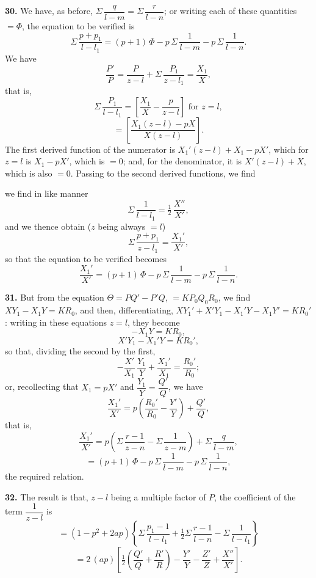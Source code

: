 \documentclass[11pt]{article}
\newcommand{\artno}[1]{\textbf{#1.}\quad}
\begin{document}
\artno{30} We have, as before, $\Sigma\,\dfrac{q}{l-m} = \Sigma\,\dfrac{r}{l-n}$; or writing each of these quantities $= \Phi$,
the equation to be verified is
\[
   \Sigma\,\frac{p+p_{1}}{l-l_{1}} = (p+1)\,\Phi - p\,\Sigma\,\frac{1}{l-m} - p\,\Sigma\,\frac{1}{l-n}.
\]
We have
\[
   \frac{P'}{P} = \frac{P}{z-l} + \Sigma\,\frac{P_{1}}{z-l_{1}} = \frac{X_{1}}{X},
\]
that is,
\[
   \Sigma\,\frac{P_{1}}{l-l_{1}} = \left[\frac{X_{1}}{X} - \frac{p}{z-l}\right]\text{ for } z = l,
\]
\[
   = \left[\frac{X_{1}(z-l) - p X}{X(z-l)}\right].
\]
The first derived function of the numerator is $X_{1}'(z-l) + X_{1} - pX'$, which for
$z = l$ is $X_{1} - pX'$, which is $=0$; and, for the denominator, it is $X'(z-l) + X$, which
is also $=0$. Passing to the second derived functions, we find

\newpage
we find in like manner
\[
   \Sigma\,\frac{1}{l-l_{1}} = \tfrac{1}{2}\,\frac{X''}{X'},
\]
and we thence obtain ($z$ being always $=l$)
\[
   \Sigma\,\frac{p+p_{1}}{z-l_{1}} = \frac{X_{1}'}{X'},
\]
so that the equation to be verified becomes
\[
   \frac{X_{1}'}{X'} = (p+1)\,\Phi - p\,\Sigma\,\frac{1}{l-m} - p\,\Sigma\,\frac{1}{l-n}.
\]

\artno{31} But from the equation $\Theta = PQ' - P'Q$, $= KP_{0}Q_{0}R_{0}$, we find $XY_{1} - X_{1}Y = KR_{0}$,
and then, differentiating, $XY_{1}' + X'Y_{1} - X_{1}'Y - X_{1}Y' = KR_{0}'$: writing in these equations
$z = l$, they become
\[
   -X_{1}Y = KR_{0},
\]
\[
   X'Y_{1} - X_{1}'Y = KR_{0}',
\]
so that, dividing the second by the first,
\[
   -\frac{X'}{X_{1}}\,\frac{Y_{1}}{Y} + \frac{X_{1}'}{X_{1}} = \frac{R_{0}'}{R_{0}};
\]
or, recollecting that $X_{1} = pX'$ and $\dfrac{Y_{1}}{Y} = \dfrac{Q'}{Q}$, we have
\[
   \frac{X_{1}'}{X'} = p\!\left(\frac{R_{0}'}{R_{0}} - \frac{Y'}{Y}\right) + \frac{Q'}{Q},
\]
that is,
\[
   \frac{X_{1}'}{X'} = p\!\left(\Sigma\,\frac{r-1}{z-n} - \Sigma\,\frac{1}{z-m}\right) + \Sigma\,\frac{q}{l-m},
\]
\[
   = (p+1)\,\Phi - p\,\Sigma\,\frac{1}{l-m} - p\,\Sigma\,\frac{1}{l-n},
\]
the required relation.

\artno{32} The result is that, $z-l$ being a multiple factor of $P$, the coefficient of the
term $\dfrac{1}{z-l}$ is
\[
   = (1 - p^{2} + 2ap)\!\left\{\Sigma\,\frac{p_{1}-1}{l-l_{1}} + \tfrac{1}{2}\Sigma\,\frac{r-1}{l-n} - \Sigma\,\frac{1}{l-l_{1}}\right\}
\]
\[
   = 2\,(ap)\!\left[\tfrac{1}{2}\!\left(\frac{Q'}{Q} + \frac{R'}{R}\right) - \frac{Y'}{Y} - \frac{Z'}{Z} + \frac{X''}{X'}\right].
\]
\end{document}
